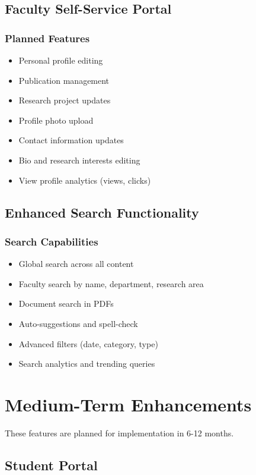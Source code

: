 \documentclass[12pt,a4paper]{report}
\begin{document}
\subsection{Faculty Self-Service Portal}

\subsubsection*{Planned Features}
\begin{itemize}
    \item Personal profile editing
    \item Publication management
    \item Research project updates
    \item Profile photo upload
    \item Contact information updates
    \item Bio and research interests editing
    \item View profile analytics (views, clicks)
\end{itemize}

\subsection{Enhanced Search Functionality}

\subsubsection*{Search Capabilities}
\begin{itemize}
    \item Global search across all content
    \item Faculty search by name, department, research area
    \item Document search in PDFs
    \item Auto-suggestions and spell-check
    \item Advanced filters (date, category, type)
    \item Search analytics and trending queries
\end{itemize}

\section{Medium-Term Enhancements}

These features are planned for implementation in 6-12 months.

\subsection{Student Portal}
\end{document}
